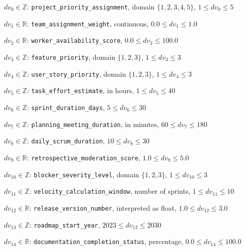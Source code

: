 \documentclass[12pt]{article}
\begin{document}
\item $ dv_0 \in \mathbb{Z} $: \texttt{project\_priority\_assignment}, domain $ \{1,2,3,4,5\} $, $ 1 \leq dv_0 \leq 5 $
    \item $ dv_1 \in \mathbb{R} $: \texttt{team\_assignment\_weight}, continuous, $ 0.0 \leq dv_1 \leq 1.0 $
    \item $ dv_2 \in \mathbb{R} $: \texttt{worker\_availability\_score}, $ 0.0 \leq dv_2 \leq 100.0 $
    \item $ dv_3 \in \mathbb{Z} $: \texttt{feature\_priority}, domain $ \{1,2,3\} $, $ 1 \leq dv_3 \leq 3 $
    \item $ dv_4 \in \mathbb{Z} $: \texttt{user\_story\_priority}, domain $ \{1,2,3\} $, $ 1 \leq dv_4 \leq 3 $
    \item $ dv_5 \in \mathbb{Z} $: \texttt{task\_effort\_estimate}, in hours, $ 1 \leq dv_5 \leq 40 $
    \item $ dv_6 \in \mathbb{Z} $: \texttt{sprint\_duration\_days}, $ 5 \leq dv_6 \leq 30 $
    \item $ dv_7 \in \mathbb{Z} $: \texttt{planning\_meeting\_duration}, in minutes, $ 60 \leq dv_7 \leq 180 $
    \item $ dv_8 \in \mathbb{Z} $: \texttt{daily\_scrum\_duration}, $ 10 \leq dv_8 \leq 30 $
    \item $ dv_9 \in \mathbb{R} $: \texttt{retrospective\_moderation\_score}, $ 1.0 \leq dv_9 \leq 5.0 $
    \item $ dv_{10} \in \mathbb{Z} $: \texttt{blocker\_severity\_level}, domain $ \{1,2,3\} $, $ 1 \leq dv_{10} \leq 3 $
    \item $ dv_{11} \in \mathbb{Z} $: \texttt{velocity\_calculation\_window}, number of sprints, $ 1 \leq dv_{11} \leq 10 $
    \item $ dv_{12} \in \mathbb{R} $: \texttt{release\_version\_number}, interpreted as float, $ 1.0 \leq dv_{12} \leq 3.0 $
    \item $ dv_{13} \in \mathbb{Z} $: \texttt{roadmap\_start\_year}, $ 2023 \leq dv_{13} \leq 2030 $
    \item $ dv_{14} \in \mathbb{R} $: \texttt{documentation\_completion\_status}, percentage, $ 0.0 \leq dv_{14} \leq 100.0 $
\end{document}
